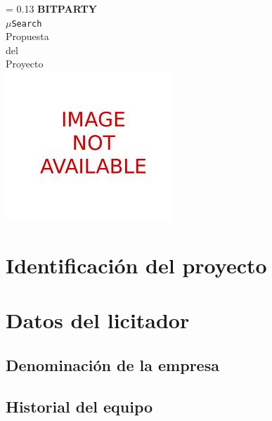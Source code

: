 \documentclass[11pt,spanish]{article}
\renewcommand{\thepage}{\roman{page}}
\newcommand{\singlelinebreak}{\\[\baselineskip]}
\newcommand{\multiplelinebreak}[1]{\\[#1\baselineskip]}
\newlength{\drop}
\newcommand*{\titulo}{\begingroup
\thispagestyle{empty}
\drop = 0.13\textheight
\centering
\vfill
\vspace*{\drop}
{\Huge\bf BITPARTY}\multiplelinebreak{2}
{\huge\tt $\mu$Search}\multiplelinebreak{2}
{\Huge Propuesta}\singlelinebreak
{\Huge del}\singlelinebreak
{\Huge Proyecto}\multiplelinebreak{2}
\includegraphics[scale=0.4]{img/imgNotAvailable.jpeg}
\vfill
\vspace*{\drop}
\endgroup}
\begin{document}
\titulo
\clearpage


\thispagestyle{empty}
\null\vspace{\fill}
\begin{abstract}


\end{abstract}

\vspace{\fill}
\newpage


\tableofcontents
\clearpage


\renewcommand{\thepage}{\arabic{page}}
\section{Identificación del proyecto}



\section{Datos del licitador}


\subsection{Denominación de la empresa}


\subsection{Historial del equipo}



\end{document}
